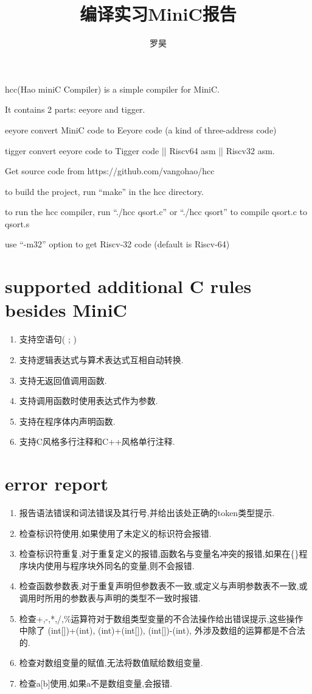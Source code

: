 \documentclass[UTF8]{article}
\begin{document}
\title{编译实习MiniC报告}
\author{罗昊}
\maketitle
hcc(Hao miniC Compiler) is a simple compiler for MiniC.

It contains 2 parts: eeyore and tigger. 

eeyore convert MiniC code to Eeyore code (a kind of three-address code)

tigger convert eeyore code to Tigger code || Riscv64 asm || Riscv32 asm.

Get source code from https://github.com/vangohao/hcc

to build the project, run ``make'' in the hcc directory.

to run the hcc compiler, run ``./hcc qsort.c'' or ``./hcc qsort'' to compile qsort.c to qsort.s

use ``-m32'' option to get Riscv-32 code (default is Riscv-64)

\section{supported additional C rules besides MiniC}
\begin{enumerate}
\item 支持空语句( ; )
\item 支持逻辑表达式与算术表达式互相自动转换.
\item 支持无返回值调用函数.
\item 支持调用函数时使用表达式作为参数.
\item 支持在程序体内声明函数.
\item 支持C风格多行注释和C++风格单行注释.
\end{enumerate}
\section{error report}
\begin{enumerate}
\item 报告语法错误和词法错误及其行号,并给出该处正确的token类型提示.
\item 检查标识符使用,如果使用了未定义的标识符会报错.
\item 检查标识符重复,对于重复定义的报错,函数名与变量名冲突的报错,如果在\{\}程序块内使用与程序块外同名的变量,则不会报错.
\item 检查函数参数表,对于重复声明但参数表不一致,或定义与声明参数表不一致,或调用时所用的参数表与声明的类型不一致时报错.
\item 检查+,-,*,/,\%运算符对于数组类型变量的不合法操作给出错误提示,这些操作中除了 (int[])+(int), (int)+(int[]), (int[])-(int), 外涉及数组的运算都是不合法 的.
\item 检查对数组变量的赋值,无法将数值赋给数组变量.
\item 检查a[b]使用,如果a不是数组变量,会报错.
\end{enumerate}
\end{document}
